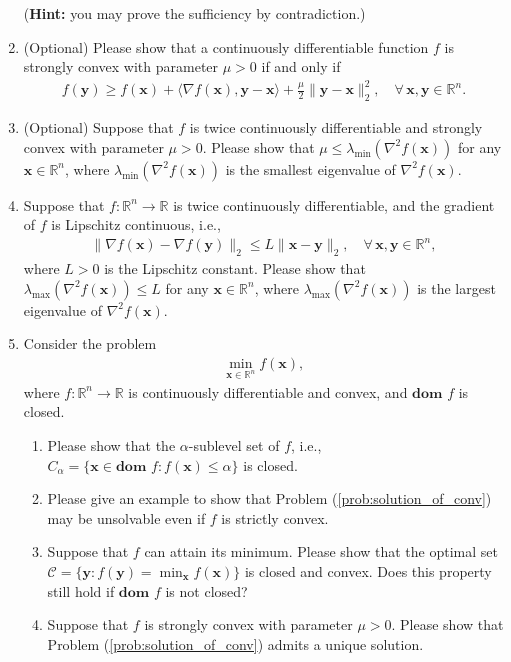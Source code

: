 \documentclass[11pt,letter,notitlepage]{article}
\begin{document}
\begin{exercise}
\begin{enumerate}
    (\textbf{Hint:} you may prove the sufficiency by contradiction.)

    \item (Optional)
    Please show that a continuously differentiable function $f$ is strongly convex with parameter $\mu>0$ if and only if
    \begin{align*}
        f(\mathbf{y})\ge f(\mathbf{x})+\langle\nabla f(\mathbf{x}),\mathbf{y}-\mathbf{x}\rangle+\frac{\mu}{2}\|\mathbf{y}-\mathbf{x}\|_2^2,\quad \forall\, \mathbf{x},\mathbf{y}\in\mathbb{R}^n.
    \end{align*}
    \item (Optional)
    Suppose that $f$ is twice continuously differentiable and strongly convex with parameter $\mu>0$. Please show that $\mu\leq \lambda_{\min}(\nabla^2 f(\mathbf{x}))$ for any $\mathbf{x}\in\mathbb{R}^n$, where $\lambda_{\min}(\nabla^2 f(\mathbf{x}))$ is the smallest eigenvalue of $\nabla^2 f(\mathbf{x})$.
    \item Suppose that $f:\mathbb{R}^n\rightarrow\mathbb{R}$ is twice continuously differentiable, and the gradient of $f$ is Lipschitz continuous, i.e.,
    \begin{align*}
        \|\nabla f(\mathbf{x})-\nabla f(\mathbf{y})\|_2\le L\|\mathbf{x}-\mathbf{y}\|_2,\quad \forall\,\mathbf{x},\mathbf{y}\in\mathbb{R}^n,
    \end{align*}
    where $L>0$ is the Lipschitz constant. Please show that $\lambda_{\max}(\nabla^2f(\mathbf{x}))\leq L$ for any $\mathbf{x}\in\mathbb{R}^n$, where $\lambda_{\max}(\nabla^2f(\mathbf{x}))$ is the largest eigenvalue of $\nabla^2 f(\mathbf{x})$.

    \item Consider the problem
    \begin{align}\label{prob:solution_of_conv}
        \min_{\textbf{x}\in\mathbb{R}^n}f(\mathbf{x}),
    \end{align}
    where $f:\mathbb{R}^n\rightarrow\mathbb{R}$ is  continuously differentiable and convex, and $\textbf{dom } f$ is closed.
    \begin{enumerate}
        \item
        Please show that the $\alpha$-sublevel set of $f$, i.e., $ C_\alpha=\{\mathbf{x}\in\textbf{dom }f:f(\mathbf{x})\leq \alpha\}
        $
        is closed.
        \item
        Please give an example to show that Problem (\ref{prob:solution_of_conv}) may be unsolvable even if $f$ is strictly convex.
        \item
        Suppose that $f$ can attain its minimum. Please show that the optimal set $\mathcal{C}=\{ \mathbf{y}:f(\mathbf{y})=\min_{\mathbf{x}} f(\mathbf{x})\}$ is closed and convex. Does this property still hold if $\textbf{dom }f$ is not closed?
        \item
        Suppose that $f$ is strongly convex with parameter $\mu>0$. Please show that Problem (\ref{prob:solution_of_conv}) admits a unique solution.
    \end{enumerate}
\end{enumerate}

\end{exercise}
\end{document}
